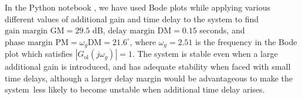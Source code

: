 \documentclass[9pt,a4paper]{article}
\begin{document}
    
    In the Python notebook \cite{python_notebook}, we have used Bode plots while applying various different values of additional gain and time delay to the system to find $\text{gain margin GM} = 29.5$ dB, $\text{delay margin DM} = 0.15$ seconds, and $\text{phase margin PM} = \omega_g\text{DM}=21.6^\circ$, where $\omega_g=2.51$ is the frequency in the Bode plot which satisfies $|G_{\text{ol}}(j\omega_g)|=1$. The system is stable even when a large additional gain is introduced, and has adequate stability when faced with small time delays, although a larger delay margin would be advantageous to make the system less likely to become unstable when additional time delay arises.

    \thispagestyle{empty}

    
    
    
\end{document}
